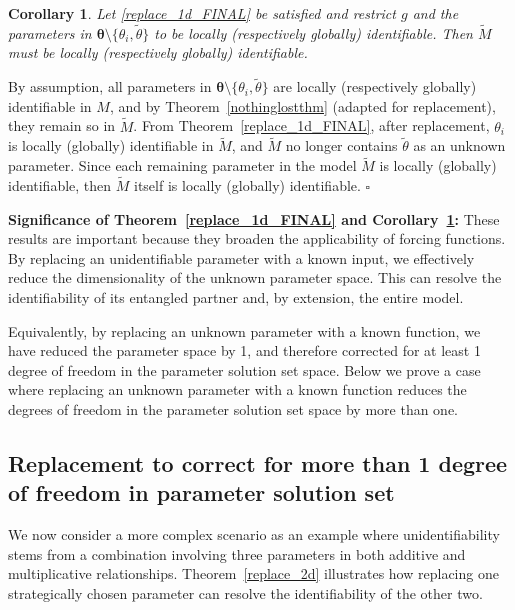 \documentclass[a4paper,fleqn]{cas-dc}
\newtheorem{corollary}{Corollary}
\theoremstyle{definition}
\begin{document}
\begin{corollary}\label{cor5}
   Let \cref{replace_1d_FINAL} be satisfied and restrict $g$ and the parameters in $\pmb{\theta} \setminus \{\theta_i, \tilde{\theta} \}$ to be locally (respectively globally) identifiable.
   Then $\tilde{M}$ must be locally (respectively globally) identifiable.
\end{corollary}
\begin{pf}
    By assumption, all parameters in $\pmb{\theta} \setminus \{\theta_i, \tilde{\theta} \}$ are locally (respectively globally) identifiable in $M$, and by Theorem~\ref{nothinglostthm} (adapted for replacement), they remain so in $\tilde{M}$.
    From Theorem~\ref{replace_1d_FINAL}, after replacement, $\theta_i$ is locally (globally) identifiable in $\tilde{M}$, and $\tilde{M}$ no longer contains $\tilde{\theta}$ as an unknown parameter.
    Since each remaining parameter in the model $\tilde{M}$ is locally (globally) identifiable, then $\tilde{M}$ itself is locally (globally) identifiable. $\square$
\end{pf}
\noindent \textbf{Significance of Theorem~\ref{replace_1d_FINAL} and Corollary~\ref{cor5}:} These results are important because they broaden the applicability of forcing functions. By replacing an unidentifiable parameter with a known input, we effectively reduce the dimensionality of the unknown parameter space. This can resolve the identifiability of its entangled partner and, by extension, the entire model.

Equivalently, by replacing an unknown parameter with a known function, we have reduced the parameter space by 1, and therefore corrected for at least 1 degree of freedom in the parameter solution set space. 
Below we prove a case where replacing an unknown parameter with a known function reduces the degrees of freedom in the parameter solution set space by more than one.

\subsection{Replacement to correct for more than 1 degree of freedom in parameter solution set} \label{s:replace_multi_dof}
\noindent We now consider a more complex scenario as an example where unidentifiability stems from a combination involving three parameters in both additive and multiplicative relationships. Theorem~\ref{replace_2d} illustrates how replacing one strategically chosen parameter can resolve the identifiability of the other two.
\end{document}
